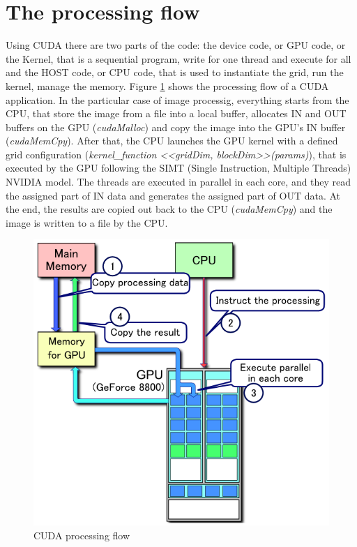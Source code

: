 \documentclass[a4paper]{article}
\begin{document}
\section{The processing flow}
\label{sec:cpf}
Using CUDA there are two parts of the code: the device code, or GPU code, or the Kernel, that is a sequential program, write for one thread and execute for all and the HOST code, or CPU code, that is used to instantiate the grid, run the kernel, manage the memory. Figure \ref{fig:flow} shows the processing flow of a CUDA application. In the particular case of image processig, everything starts from the CPU, that store the image from a file into a local buffer, allocates IN and OUT buffers on the GPU (\textit{cudaMalloc}) and copy the image into the GPU's IN buffer (\textit{cudaMemCpy}). After that, the CPU launches the GPU kernel with a defined grid configuration (\textit{kernel\_function <<gridDim, blockDim>>(params)}), that is executed by the GPU following the SIMT (Single Instruction, Multiple Threads) NVIDIA model. The threads are executed in parallel in each core, and they read the assigned part of IN data and generates the assigned part of OUT data. At the end, the results are copied out back to the CPU (\textit{cudaMemCpy}) and the image is written to a file by the CPU.

\begin{figure}[ht]
    \centering
    \includegraphics[width=0.5\linewidth]{flow}
    \caption{CUDA processing flow}
    \label{fig:flow}
\end{figure}
\FloatBarrier
\end{document}
